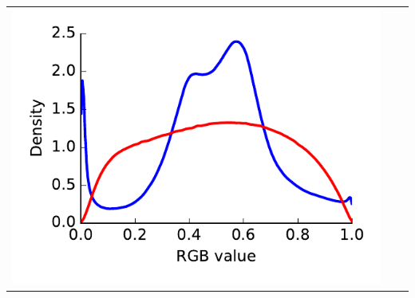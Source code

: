 \documentclass[16pt,presentation]{beamer}
\begin{document}
\begin{frame}
{\begin{tabular}[t]{ccc}
\hspace{-0.3cm}\includegraphics[scale=0.33,clip = true]{figs/MEFN/fig_texture_RGB_hist.pdf} \\
\end{tabular}
}
\end{frame}
\end{document}
